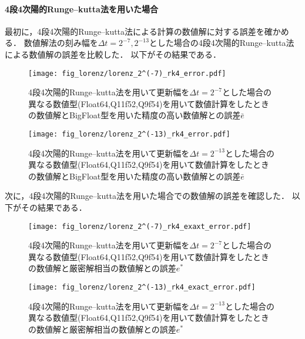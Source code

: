 \paragraph*{4段4次陽的Runge--kutta法を用いた場合}
最初に，4段4次陽的Runge--kutta法による計算の数値解に対する誤差を確かめる．
数値解法の刻み幅を$\Delta t = 2^{-7},2^{-13}$とした場合の4段4次陽的Runge--kutta法による数値解の誤差を比較した．
以下がその結果である．
\begin{figure}[H]
    \centering
    \begin{minipage}[b]{0.49\columnwidth}
        \centering
        \texttt{[image: fig\_lorenz/lorenz\_2^(-7)\_rk4\_error.pdf]}
        \caption{4段4次陽的Runge--kutta法を用いて更新幅を$\Delta t = 2^{-7}$とした場合の異なる数値型(Float64,Q11f52,Q9f54)を用いて数値計算をしたときの数値解とBigFloat型を用いた精度の高い数値解との誤差$\bar{e}$}
        \label{fig:lorenz_2^(-7)_rk4_error}
    \end{minipage}
    \begin{minipage}[b]{0.49\columnwidth}
        \centering
        \texttt{[image: fig\_lorenz/lorenz\_2^(-13)\_rk4\_error.pdf]}
        \caption{4段4次陽的Runge--kutta法を用いて更新幅を$\Delta t =  2^{-13}$とした場合の異なる数値型(Float64,Q11f52,Q9f54)を用いて数値計算をしたときの数値解とBigFloat型を用いた精度の高い数値解との誤差$\bar{e}$}
        \label{fig:lorenz_2^(-13)_rk4_error}
    \end{minipage}
\end{figure}
次に，4段4次陽的Runge--kutta法を用いた場合での数値解の誤差を確認した．
以下がその結果である．
\begin{figure}[H]
    \centering
    \begin{minipage}[b]{0.49\columnwidth}
        \centering
        \texttt{[image: fig\_lorenz/lorenz\_2^(-7)\_rk4\_exaxt\_error.pdf]}
        \caption{4段4次陽的Runge--kutta法を用いて更新幅を$\Delta t = 2^{-7}$とした場合の異なる数値型(Float64,Q11f52,Q9f54)を用いて数値計算をしたときの数値解と厳密解相当の数値解との誤差$e^{\ast}$}
        \label{fig:lorenz_2^(-7)_rk4_exact_error}
    \end{minipage}
    \begin{minipage}[b]{0.49\columnwidth}
        \centering
        \texttt{[image: fig\_lorenz/lorenz\_2^(-13)\_rk4\_exact\_error.pdf]}
        \caption{4段4次陽的Runge--kutta法を用いて更新幅を$\Delta t =  2^{-13}$とした場合の異なる数値型(Float64,Q11f52,Q9f54)を用いて数値計算をしたときの数値解と厳密解相当の数値解との誤差$e^{\ast}$}
        \label{fig:lorenz_2^(-13)_rk4_exact_error}
    \end{minipage}
\end{figure}

